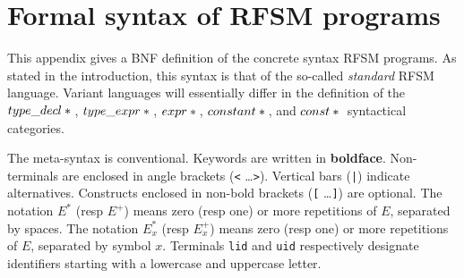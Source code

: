 \chapter{ Formal syntax of RFSM programs}
\label{cha:bnf}

This appendix gives a BNF definition of the concrete syntax RFSM programs.
As stated in the introduction, this syntax is that of the so-called \emph{standard} RFSM language.
Variant languages will essentially differ in the definition of the
$type\_decl*{}$,
$type\_expr*{}$,
$expr*{}$,
$constant*{}$,
and $const*{}$
syntactical categories.

\medskip
The meta-syntax is conventional. Keywords are written in \textbf{boldface}.  Non-terminals are
enclosed in angle brackets ({\tt <} \ldots {\tt >}).  Vertical bars ({\tt |}) indicate
alternatives.  Constructs enclosed in non-bold brackets ({\tt [} \ldots {\tt ]}) are optional.
The notation $E^*$ (resp $E^+$) means zero (resp one) or more repetitions of $E$, separated by spaces.
The notation $E^*_x$ (resp $E^+_x$) means zero (resp one) or more repetitions of $E$, separated by
symbol $x$. Terminals \verb|lid| and \verb|uid| respectively designate identifiers
starting with a lowercase and uppercase letter. 




